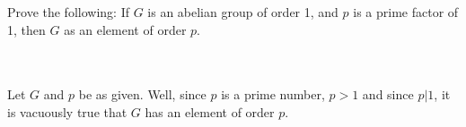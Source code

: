 Prove the following: If $G$ is an abelian group of order 1, and $p$ is a prime factor of 1, then $G$ as
an element of order $p$.\\\\

\begin{solution}\renewcommand{\qedsymbol}{}\ \\
    Let $G$ and $p$ be as given. Well, since $p$ is a prime number, $p>1$ and since $p|1$, it is
    vacuously true that $G$ has an element of order $p$.

\end{solution}